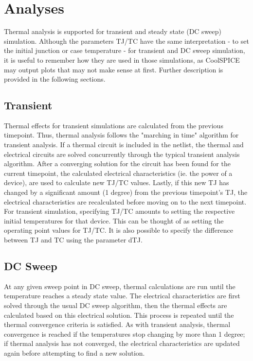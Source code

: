 \section{Analyses}
\label{subsec_sceadm_thermalAnalyses}

Thermal analysis is supported for transient and steady state (DC sweep) simulation. Although the parameters TJ/TC have the same interpretation - to set the initial junction or case temperature - for transient and DC sweep simulation, it is useful to remember how they are used in those simulations, as CoolSPICE may output plots that may not make sense at first. Further description is provided in the following sections.

\subsection{Transient}
Thermal effects for transient simulations are calculated from the previous timepoint. Thus, thermal analysis follows the "marching in time" algorithm for transient analysis. If a thermal circuit is included in the netlist, the thermal and electrical circuits are solved concurrently through the typical transient analysis algorithm. After a converging solution for the circuit has been found for the current timepoint, the calculated electrical characteristics (ie. the power of a device), are used to calculate new TJ/TC values. Lastly, if this new TJ has changed by a significant amount (1 degree) from the previous timepoint's TJ, the electrical characteristics are recalculated before moving on to the next timepoint. \\

For transient simulation, specifying TJ/TC amounts to setting the respective initial temperatures for that device. This can be thought of as setting the operating point values for TJ/TC. It is also possible to specify the difference between TJ and TC using the parameter dTJ. 

\subsection{DC Sweep}

At any given sweep point in DC sweep, thermal calculations are run until the temperature reaches a steady state value. The electrical characteristics are first solved through the usual DC sweep algorithm, then the thermal effects are calculated based on this electrical solution. This process is repeated until the thermal convergence criteria is satisfied. As with transient analysis, thermal convergence is reached if the temperatures stop changing by more than 1 degree; if thermal analysis has not converged, the electrical characteristics are updated again before attempting to find a new solution. \\

